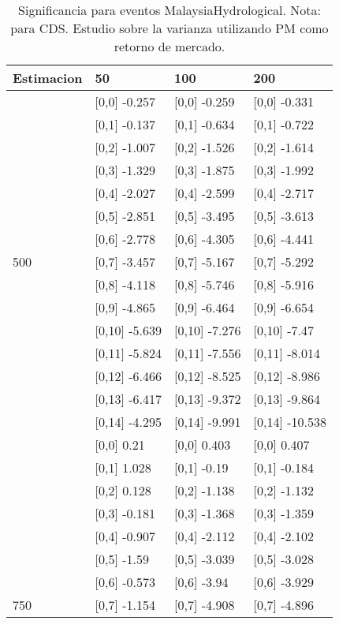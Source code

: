 \begin{table}

\caption{Significancia para eventos MalaysiaHydrological. Nota: para CDS. Estudio sobre la varianza utilizando PM como retorno de mercado.}
\centering
\begin{tabular}[t]{llll}
\toprule
Estimacion & 50 & 100 & 200\\
\midrule
 & {}[0,0] -0.257 & {}[0,0] -0.259 & {}[0,0] -0.331\\
 & {}[0,1] -0.137 & {}[0,1] -0.634 & {}[0,1] -0.722\\
 & {}[0,2] -1.007 & {}[0,2] -1.526 & {}[0,2] -1.614\\
 & {}[0,3] -1.329 & {}[0,3] -1.875 & {}[0,3] -1.992\\
 & {}[0,4] -2.027 & {}[0,4] -2.599 & {}[0,4] -2.717\\
\addlinespace
 & {}[0,5] -2.851 & {}[0,5] -3.495 & {}[0,5] -3.613\\
 & {}[0,6] -2.778 & {}[0,6] -4.305 & {}[0,6] -4.441\\
500 & {}[0,7] -3.457 & {}[0,7] -5.167 & {}[0,7] -5.292\\
 & {}[0,8] -4.118 & {}[0,8] -5.746 & {}[0,8] -5.916\\
 & {}[0,9] -4.865 & {}[0,9] -6.464 & {}[0,9] -6.654\\
\addlinespace
 & {}[0,10] -5.639 & {}[0,10] -7.276 & {}[0,10] -7.47\\
 & {}[0,11] -5.824 & {}[0,11] -7.556 & {}[0,11] -8.014\\
 & {}[0,12] -6.466 & {}[0,12] -8.525 & {}[0,12] -8.986\\
 & {}[0,13] -6.417 & {}[0,13] -9.372 & {}[0,13] -9.864\\
 & {}[0,14] -4.295 & {}[0,14] -9.991 & {}[0,14] -10.538\\
\addlinespace
 & {}[0,0] 0.21 & {}[0,0] 0.403 & {}[0,0] 0.407\\
 & {}[0,1] 1.028 & {}[0,1] -0.19 & {}[0,1] -0.184\\
 & {}[0,2] 0.128 & {}[0,2] -1.138 & {}[0,2] -1.132\\
 & {}[0,3] -0.181 & {}[0,3] -1.368 & {}[0,3] -1.359\\
 & {}[0,4] -0.907 & {}[0,4] -2.112 & {}[0,4] -2.102\\
\addlinespace
 & {}[0,5] -1.59 & {}[0,5] -3.039 & {}[0,5] -3.028\\
 & {}[0,6] -0.573 & {}[0,6] -3.94 & {}[0,6] -3.929\\
750 & {}[0,7] -1.154 & {}[0,7] -4.908 & {}[0,7] -4.896\\

\end{tabular}
\end{table}
